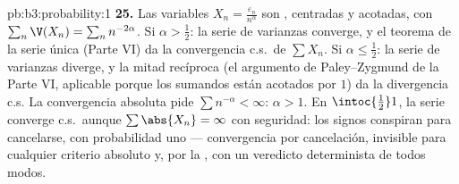 \begin{solution}{pb:b3:probability:1}
\textbf{25.} Las variables $X_n = \frac{\varepsilon_n}
{n^\alpha}$ son
, centradas y
acotadas, con $\sum_n\V(X_n) = \sum_nn^{-2\alpha}$. Si $\alpha >
\frac12$: la serie de varianzas converge, y el teorema de la serie única
(Parte VI) da la convergencia c.s.\ de $\sum X_n$. Si
$\alpha \leq \frac12$: la serie de varianzas diverge, y la mitad
recíproca (el argumento de Paley--Zygmund de la Parte VI, aplicable
porque los sumandos están acotados por $1$) da la divergencia c.s. La
convergencia absoluta pide $\sum n^{-\alpha} < \infty$: $\alpha > 1$. En
$\intoc{\frac12}1$, la serie converge c.s.\ aunque
$\sum\abs{X_n} = \infty$ con seguridad: los signos conspiran para
cancelarse, con probabilidad uno --- convergencia por cancelación,
invisible para cualquier criterio absoluto y, por la
, con un veredicto
determinista de todos modos.
\end{solution}
